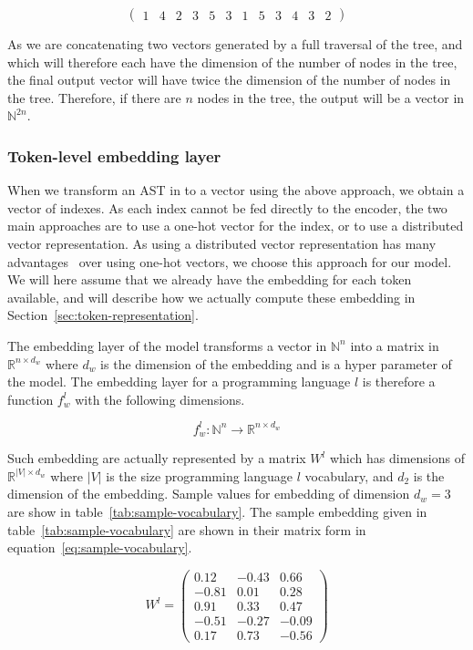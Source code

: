 \[ \begin{pmatrix}1 & 4 & 2 & 3 & 5 & 3 & 1 & 5 & 3 & 4 & 3 & 2\end{pmatrix} \]

As we are concatenating two vectors generated by a full traversal of the tree,
and which will therefore each have the dimension of the number of nodes in the
tree, the final output vector will have twice the dimension of the number of
nodes in the tree. Therefore, if there are $n$ nodes in the tree, the output
will be a vector in $\mathbb{N}^{2n}$.
%
\subsubsection{Token-level embedding layer}
When we transform an AST in to a vector using the above approach, we obtain a
vector of indexes. As each index cannot be fed directly to the encoder, the two
main approaches are to use a one-hot vector for the index, or to use a
distributed vector representation. As using a distributed vector representation
has many advantages~\cite{DBLP:journals/corr/MikolovSCCD13} over using one-hot
vectors, we choose this approach for our model. We will here assume that we
already have the embedding for each token available, and will describe how we
actually compute these embedding in Section~\ref{sec:token-representation}.

The embedding layer of the model transforms a vector in $\mathbb{N}^n$ into a
matrix in $\mathbb{R}^{n\times d_w}$ where $d_w$ is the dimension of the embedding
and is a hyper parameter of the model. The embedding layer for a programming
language $l$ is therefore a function $f_w^l$ with the following dimensions.

\begin{equation}
  f_w^l : \mathbb{N}^n \rightarrow \mathbb{R}^{n\times d_w}
\end{equation}

Such embedding are actually represented by a matrix $W^l$ which has dimensions
of $\mathbb{R}^{|V|\times d_w}$ where $|V|$ is the size programming language $l$
vocabulary, and $d_2$ is the dimension of the embedding.
Sample values for embedding of dimension $d_w = 3$ are show in
table~\ref{tab:sample-vocabulary}.
The sample embedding given in table~\ref{tab:sample-vocabulary} are
shown in their matrix form in equation~\ref{eq:sample-vocabulary}.

\begin{equation}
  \label{eq:sample-vocabulary}
  W^l =
  \begin{pmatrix}
    0.12 & -0.43 & 0.66\\
    -0.81 & 0.01 & 0.28\\
    0.91 & 0.33 & 0.47\\
    -0.51 & -0.27 & -0.09\\
    0.17 & 0.73 & -0.56
  \end{pmatrix}
\end{equation}


